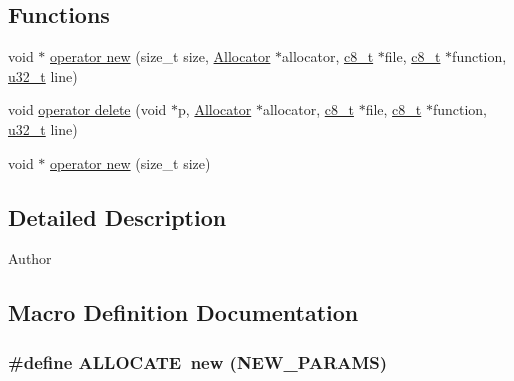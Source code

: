 \subsection*{Functions}
\begin{DoxyCompactItemize}
\item 
void $\ast$ \hyperlink{_allocator_8h_a63f35182ff333566e66717b5af850733}{operator new} (size\-\_\-t size, \hyperlink{class_allocator}{Allocator} $\ast$allocator, \hyperlink{types_8h_a93d4fa6fb79d31926edb1d51e2f502d2}{c8\-\_\-t} $\ast$file, \hyperlink{types_8h_a93d4fa6fb79d31926edb1d51e2f502d2}{c8\-\_\-t} $\ast$function, \hyperlink{types_8h_a0c0a490ab7fa397be6c764a935cc5ea4}{u32\-\_\-t} line)
\item 
void \hyperlink{_allocator_8h_a1525b45390e2b112a1796d6eef1202d6}{operator delete} (void $\ast$p, \hyperlink{class_allocator}{Allocator} $\ast$allocator, \hyperlink{types_8h_a93d4fa6fb79d31926edb1d51e2f502d2}{c8\-\_\-t} $\ast$file, \hyperlink{types_8h_a93d4fa6fb79d31926edb1d51e2f502d2}{c8\-\_\-t} $\ast$function, \hyperlink{types_8h_a0c0a490ab7fa397be6c764a935cc5ea4}{u32\-\_\-t} line)
\item 
void $\ast$ \hyperlink{_allocator_8h_a205ed048fdf5259c2e8e0cb60ee8f719}{operator new} (size\-\_\-t size)
\end{DoxyCompactItemize}


\subsection{Detailed Description}
\begin{DoxyAuthor}{Author}

\end{DoxyAuthor}


\subsection{Macro Definition Documentation}
\subsubsection[{A\-L\-L\-O\-C\-A\-T\-E}]{\setlength{\rightskip}{0pt plus 5cm}\#define A\-L\-L\-O\-C\-A\-T\-E~new ({\bf N\-E\-W\-\_\-\-P\-A\-R\-A\-M\-S})}\label{_allocator_8h_aaee4c38c9ed86ede98d1d4c05f14b0c5}
